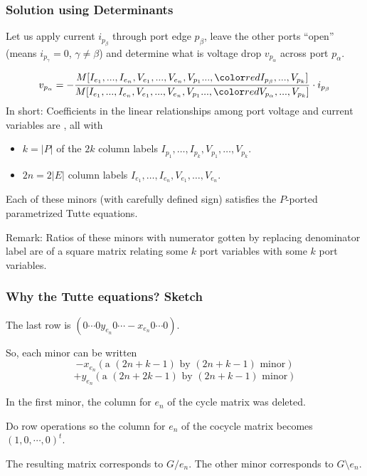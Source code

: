 \documentclass{beamer}
\begin{document}
\begin{frame}
\frametitle{Solution using Determinants}
Let us apply current $i_{p_{\beta}}$ through port edge $p_{\beta}$,
leave the other ports ``open'' (means $i_{p_{\gamma}}=0$, $\gamma\neq\beta$)
and determine what is voltage drop $v_{p_{\alpha}}$ across port $p_{\alpha}$.

\[
v_{p_{\alpha}}=-\frac{M[I_{e_1},...,I_{e_n},V_{e_1},...,V_{e_n},
                V_{p_1}...,\Remph{I_{p_{\beta}}},...,V_{p_k}]}
                   {M[I_{e_1},...,I_{e_n},V_{e_1},...,V_{e_n},
                V_{p_1}...,\Remph{V_{p_{\alpha}}},...,V_{p_k}]}
                  \cdot i_{p_{\beta}}
\]
In short: Coefficients in the linear relationships among port voltage
and current variables are ,
all with
\begin{itemize}
\item $k=|P|$ of the $2k$ column labels 
$I_{p_1},\ldots,I_{p_k},V_{p_1},\ldots,V_{p_k}$.
\item
{} $2n=2|E|$ column labels
$I_{e_1},\ldots,I_{e_n},V_{e_1},\ldots,V_{e_n}$.
\end{itemize}

\begin{theorem}
Each of these minors (with carefully defined sign)
satisfies the $P$-ported parametrized
Tutte equations.
\end{theorem}

Remark: Ratios of these minors with numerator gotten by replacing 
 denominator label are 
of a square matrix relating some $k$ port variables with some
$k$ port variables.

\end{frame}


\begin{frame}
\frametitle{Why the Tutte equations? Sketch}

The last row is $(0 \cdots 0 y_{e_n} 0 \cdots -x_{e_n} 0 \cdots 0)$.

So, each minor can be written 
\[
-x_{e_n}(\text{a }(2n+k-1)\text{ by }(2n+k-1)\text{ minor})
\]
\[
+y_{e_n}(\text{a }(2n+2k-1)\text{ by }(2n+k-1)\text{ minor})
\]

In the first minor, the column for $e_n$ of the cycle matrix was deleted.

Do row operations so the column for $e_n$ of the cocycle matrix becomes
$(1,0,\cdots,0)^t$.

The resulting matrix corresponds to $G/e_n$.  The other minor
corresponds to $G\!\setminus\! e_n$.
\end{frame}
\end{document}
